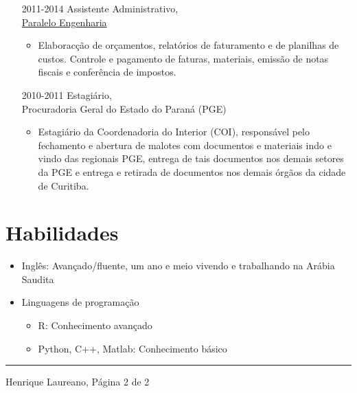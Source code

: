 \documentclass[12pt]{article}
\newcommand{\horrule}[1]{\noindent\rule{\linewidth}{#1}}
\begin{document}
\begin{itemize}
 \item[2011-2014] Assistente Administrativo,\\
                  \href{https://paralelo.eng.br/}{Paralelo Engenharia}
  \begin{itemize}
   \item Elaborac\c{c}\~{a}o de or\c{c}amentos, relat\'{o}rios de
         faturamento e de planilhas de custos. Controle e pagamento de
         faturas, materiais, emiss\~{a}o de notas fiscais e
         confer\^{e}ncia de impostos.
  \end{itemize}

 \item[2010-2011] Estagi\'{a}rio,\\
                  Procuradoria Geral do Estado do Paran\'{a} (PGE)
  \begin{itemize}
   \item Estagi\'{a}rio da Coordenadoria do Interior (COI),
         respons\'{a}vel pelo fechamento e abertura de malotes com
         documentos e materiais indo e vindo das regionais PGE, entrega de
         tais documentos nos demais setores da PGE e entrega e retirada de
         documentos nos demais \'{o}rg\~{a}os da cidade de Curitiba.
  \end{itemize}
\end{itemize}

\section*{Habilidades}

\begin{itemize}
 \item Ingl\^{e}s: Avan\c{c}ado/fluente, um ano e meio vivendo e
       trabalhando na Ar\'{a}bia Saudita
 \item Linguagens de programa\c{c}\~{a}o
  \begin{itemize}
   \item R: Conhecimento avan\c{c}ado
   \item Python, C++, Matlab: Conhecimento b\'{a}sico
  \end{itemize}
\end{itemize}

\vspace{\fill}
\horrule{1pt}
\noindent Henrique Laureano, \hfill P\'{a}gina 2 de 2
\end{document}
